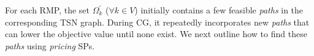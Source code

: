 \documentclass[12pt]{article}
\begin{document}





For each RMP, the set $\Omega^{\prime}_{k}$ ($\forall k\in V$) initially contains a few feasible \textit{paths} in the corresponding TSN graph. During CG, it repeatedly incorporates new \textit{paths} that can lower the objective value until none exist. We next outline how to find these \textit{paths} using \textit{pricing} SPs.


\end{document}

